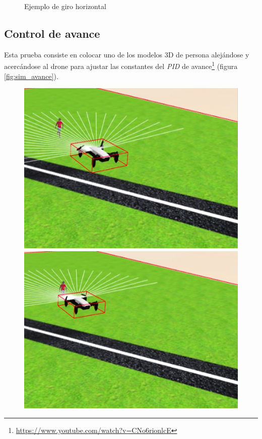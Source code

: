 \begin{figure}[!htb]
\endminipage\hfill
\caption{Ejemplo de giro horizontal}
\label{fig:sim_giro}
\end{figure}
\subsection*{Control de avance}
Esta prueba consiste en colocar uno de los modelos 3D de persona alejándose y acercándose al drone para ajustar las constantes del \textit{PID} de avance\footnote{\url{https://www.youtube.com/watch?v=CNo6rionlcE}} (figura \ref{fig:sim_avance}).

\begin{figure}[!htb]
    \includegraphics[width=\linewidth]{figures/simulado/avance_1.png}
\endminipage\hfill
{}
    \includegraphics[width=\linewidth]{figures/simulado/avance_2.png}

\end{figure}
